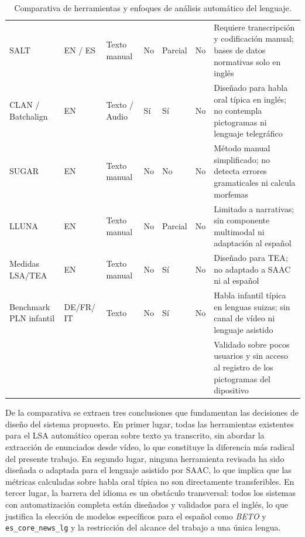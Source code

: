 \begin{table}[h]
  \footnotesize
  \renewcommand{\arraystretch}{1.3}
  \setlength{\tabcolsep}{4pt}
  \begin{center}
  \begin{tabular}{|L{2.1cm}|C{1.4cm}|C{1.7cm}|C{1.4cm}|C{1.3cm}|C{1.2cm}|L{4.0cm}|}
  \hline
   &  &  &  &  &  &  \\ \hline
  SALT & EN / ES & Texto manual & No & Parcial & No &
  Requiere transcripción y codificación manual; bases de datos normativas solo en inglés \\ \hline
  CLAN / Batchalign & EN & Texto / Audio & Sí & Sí & No &
  Diseñado para habla oral típica en inglés; no contempla pictogramas ni lenguaje telegráfico \\ \hline
  SUGAR & EN & Texto manual & No & No & No &
  Método manual simplificado; no detecta errores gramaticales ni calcula morfemas \\ \hline
  LLUNA & EN & Texto manual & No & Parcial & No &
  Limitado a narrativas; sin componente multimodal ni adaptación al español \\ \hline
  Medidas LSA/TEA & EN & Texto manual & No & Sí & No &
  Diseñado para \ac{TEA}; no adaptado a \ac{SAAC} ni al español \\ \hline
  Benchmark PLN infantil & DE/FR/\,IT & Texto & No & Sí & No &
  Habla infantil típica en lenguas suizas; sin canal de vídeo ni lenguaje asistido \\ \hline
   &  &  &  &  &  &
  Validado sobre pocos usuarios y sin acceso al registro de los pictogramas del dipositivo \\ \hline
  \end{tabular}
  \end{center}
  \caption[Comparativa de herramientas]{Comparativa de herramientas y enfoques de análisis automático del lenguaje.}
  \label{tab:comparativa}
  \renewcommand{\arraystretch}{1}
\end{table}

De la comparativa se extraen tres conclusiones que fundamentan las decisiones de diseño
del sistema propuesto. En primer lugar, todas las herramientas existentes para el
\ac{LSA} automático operan sobre texto ya transcrito, sin abordar la extracción de
enunciados desde vídeo, lo que constituye la diferencia más radical del presente
trabajo. En segundo lugar, ninguna herramienta revisada ha sido diseñada o adaptada
para el lenguaje asistido por \ac{SAAC}, lo que implica que las métricas calculadas
sobre habla oral típica no son directamente transferibles. En tercer lugar, la barrera
del idioma es un obstáculo transversal: todos los sistemas con automatización completa
están diseñados y validados para el inglés, lo que justifica la elección de modelos
específicos para el español como \emph{BETO} y \texttt{es\_core\_news\_lg} y la
restricción del alcance del trabajo a una única lengua.
